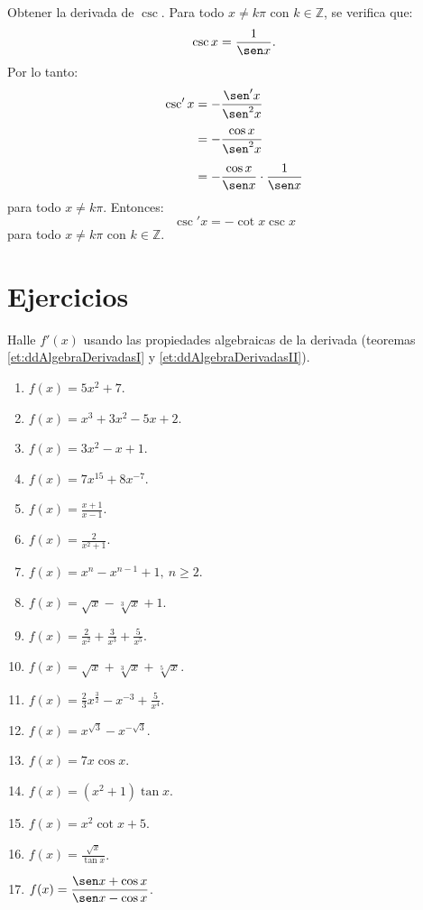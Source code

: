 \begin{exemplo}[Solución]{%
Obtener la derivada de $\csc$.
}%
Para todo $x\neq k\pi$ con $k\in \mathbb{Z}$, se verifica que:
\[
\csc x = \frac{1}{\sen x}.
\]
Por lo tanto:
\begin{align*}
\csc' x &= -\frac{\sen' x}{\sen^2 x} \\[4pt]
   &= -\frac{\cos x}{\sen^2 x} \\[4pt]
   &= -\frac{\cos x}{\sen x}\cdot\frac{1}{\sen x}
\end{align*}
para todo $x \neq k\pi$. Entonces:
\[
\csc' x  = -\cot x \csc x
\]
para todo $x \neq k\pi$ con $k\in\mathbb{Z}$.
\end{exemplo}

\section{Ejercicios}
\begingroup\small
Halle $f'(x)$ usando las propiedades algebraicas de la derivada (teoremas
\ref{et:ddAlgebraDerivadasI} y \ref{et:ddAlgebraDerivadasII}).
\begin{multicols}{2}
\begin{enumerate}[leftmargin=*]
\item $\displaystyle f(x) = 5x^2 + 7$.
\item $\displaystyle f(x) = x^3 + 3x^2 - 5x + 2$.
\item $f(x) = 3x^2-x+1$.
\item $\displaystyle f(x) = 7x^{15} + 8x^{-7}$.
\item $f(x) = \frac{x+1}{x-1}$.
\item $f(x) = \frac{2}{x^2+1}$.
\item $f(x) = x^n-x^{n-1}+1, \ n\geq 2$.
\item $f(x) = \sqrt{x}-\sqrt[3]{x}+1$.
\item $\displaystyle f(x) = \frac{2}{x^2} + \frac{3}{x^3} + \frac{5}{x^5}$.
\item $\displaystyle f(x) = \sqrt{x} + \sqrt[3]{x} + \sqrt[5]{x}$.
\item $\displaystyle f(x) = \frac{2}{3}x^{\frac{3}{2}} - x^{-3} + \frac{5}{x^4}$.
\item $\displaystyle f(x) = x^{\sqrt{3}} - x^{-\sqrt{3}}$.
\item $\displaystyle f(x) = 7x\cos x$.
\item $\displaystyle f(x) = (x^2 + 1)\tan x$.
\item $\displaystyle f(x) = x^2\cot x + 5$.
\item $\displaystyle f(x) = \frac{\sqrt{x}}{\tan x}$.
\item $\displaystyle f(x) = \frac{\sen x + \cos x}{\sen x - \cos x}$.
\end{enumerate}
\end{multicols}
\endgroup

